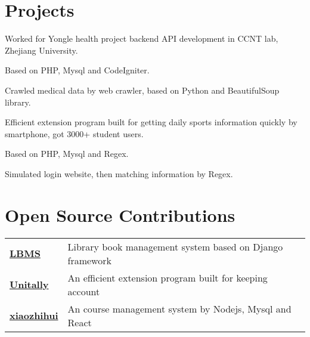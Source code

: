 \documentclass[]{deedy-resume-openfont}
\begin{document}
\begin{minipage}[t]{0.73\textwidth}

\section{Projects}
\sectionsep

\begin{tightemize}
    \item Worked for Yongle health project backend API development in CCNT lab, Zhejiang University.
    \item Based on PHP, Mysql and CodeIgniter.
    \item Crawled medical data by web crawler, based on Python and BeautifulSoup library.
    \end{tightemize}
\sectionsep

\begin{tightemize}
    \item Efficient extension program built for getting daily sports information quickly by smartphone, got 3000+ student users.
    \item Based on PHP, Mysql and Regex.
    \item Simulated login website, then matching information by Regex.
    \end{tightemize}
\sectionsep



\section{Open Source Contributions}
\begin{tabular}{ll}
\href{https://github.com/vinci7/LBMS-by-Django}{\bf LBMS} & Library book management system based on Django framework\\
\href{https://coding.net/u/vinchi/p/Unitally/}{\bf Unitally} & An efficient extension program built for keeping account \\
\href{https://coding.net/u/vinchi/p/DragonCMS}{\bf xiaozhihui} & An course management system by Nodejs, Mysql and React\\
\end{tabular}
\sectionsep



\end{minipage}
\end{document}
